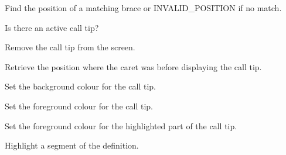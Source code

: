 Find the position of a matching brace or INVALID\_POSITION if no match.


\label{wxstyledtextctrlcalltipactive}


Is there an active call tip?


\label{wxstyledtextctrlcalltipcancel}


Remove the call tip from the screen.


\label{wxstyledtextctrlcalltipposatstart}


Retrieve the position where the caret was before displaying the call tip.


\label{wxstyledtextctrlcalltipsetbackground}


Set the background colour for the call tip.


\label{wxstyledtextctrlcalltipsetforeground}


Set the foreground colour for the call tip.


\label{wxstyledtextctrlcalltipsetforegroundhighlight}


Set the foreground colour for the highlighted part of the call tip.


\label{wxstyledtextctrlcalltipsethighlight}


Highlight a segment of the definition.


\label{wxstyledtextctrlcalltipshow}


